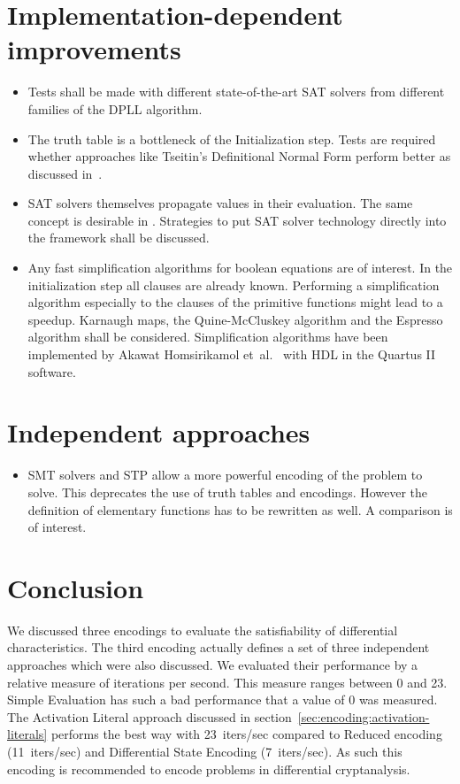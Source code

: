 \section{Implementation-dependent improvements}
%
\begin{itemize}
  \item Tests shall be made with different state-of-the-art SAT solvers from different families of the DPLL algorithm.
  \item The truth table is a bottleneck of the Initialization step. Tests are required whether approaches like Tseitin's Definitional Normal Form perform better as discussed in~\cite{Sat03}.
  \item SAT solvers themselves propagate values in their evaluation. The same concept is desirable in \nltool. Strategies to put SAT solver technology directly into the framework shall be discussed.
  \item Any fast simplification algorithms for boolean equations are of interest. In the initialization step all clauses are already known. Performing a simplification algorithm especially to the clauses of the primitive functions might lead to a speedup. Karnaugh maps, the Quine-McCluskey algorithm and the Espresso algorithm shall be considered. Simplification algorithms have been implemented by Akawat Homsirikamol et~al.~\cite{Cry04} with HDL in the Quartus II software.
\end{itemize}

\section{Independent approaches}
%
\begin{itemize}
  \item SMT solvers and STP allow a more powerful encoding of the problem to solve. This deprecates the use of truth tables and encodings. However the definition of elementary functions has to be rewritten as well. A comparison is of interest.
\end{itemize}


\section{Conclusion}
%
We discussed three encodings to evaluate the satisfiability of differential characteristics. The third encoding actually defines a set of three independent approaches which were also discussed. We evaluated their performance by a relative measure of iterations per second. This measure ranges between 0 and 23. Simple Evaluation  has such a bad performance that a value of $0$ was measured. The Activation Literal approach discussed in section~\ref{sec:encoding:activation-literals} performs the best way with 23~iters/sec compared to Reduced encoding (11~iters/sec) and Differential State Encoding (7~iters/sec). As such this encoding is recommended to encode problems in differential cryptanalysis.
